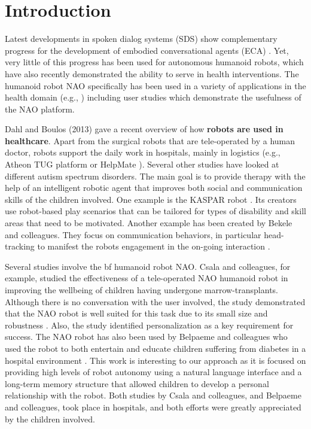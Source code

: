 \documentclass[letterpaper]{article}
\begin{document}
\section{Introduction} \label{intro}

Latest developments in spoken dialog systems (SDS) show complementary progress for the development of  embodied conversational agents (ECA) \cite{YASCLL14}. Yet, very little of
this progress has been used for autonomous humanoid robots, which have also recently demonstrated the ability
to serve in health interventions. The
humanoid robot NAO specifically has been used in a variety of applications in the health domain (e.g.,
\cite{MAJA13}) including user studies which demonstrate the usefulness of the NAO platform.

Dahl and Boulos (2013) \nocite{robotics3010001} gave a recent overview of how {\bf robots are used in
healthcare}. Apart from the  surgical robots that are tele-operated by a human doctor, robots support
the daily work in hospitals, mainly in logistics (e.g., Atheon TUG platform \cite{bloss2011mobile}
or HelpMate \cite{evans1998helpmate}). Several other studies have looked at different autism
spectrum disorders. The main goal is to provide therapy with the help of an intelligent robotic
agent that improves both social and communication skills of the children involved. One example is
the KASPAR robot \cite{robins2012scenarios}. Its creators use robot-based play scenarios that can
be tailored for types of disability and skill areas that need to be motivated. Another example has
been created by Bekele and colleagues. They focus on communication behaviors, in particular
head-tracking to manifest the robots engagement in the on-going interaction \cite{bekele2013step}.  

Several studies involve the {bf humanoid robot NAO}. Csala and colleagues, for example,
studied the effectiveness of a tele-operated NAO humanoid robot in improving the wellbeing of
children having undergone marrow-transplants. Although there is no conversation with the user
involved, the study demonstrated that the NAO robot is well suited for this task due to its small
size and robustness \cite{Csala2012}. Also, the study identified personalization as a key
requirement for success. The NAO robot has also been used by Belpaeme and colleagues who used the
robot to both entertain and educate children suffering from diabetes in a hospital environment
\cite{belpaeme2012multimodal}. This work is interesting to our approach as it is focused on
providing high levels of robot autonomy using a natural language interface and a long-term memory
structure that allowed children to develop a personal relationship with the robot. Both studies by
Csala and colleagues, and Belpaeme and colleagues, took place in hospitals, and both efforts were
greatly appreciated by the children involved.
\end{document}
